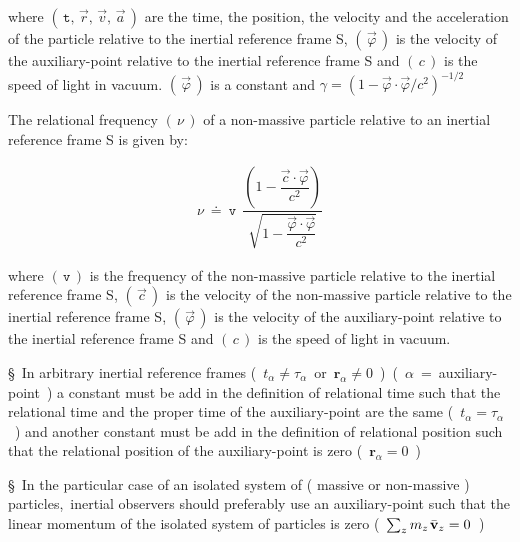 \documentclass[10pt,fleqn]{article}
\begin{document}
\par \vspace{+1.20em}
\noindent where $( \, \mathtt{t}, \, \vec{r}, \, \vec{v}, \, \vec{a} \, )$ are the time, the position, the velocity and the acceleration of the particle relative to the inertial reference frame S, $( \, \vec{\varphi} \, )$ is the velocity of the auxiliary-point relative to the inertial reference frame S and $( \, c \, )$ is the speed of light in vacuum. $( \, \vec{\varphi} \, )$ is a constant and {\small $\gamma = ({1 - \vec{\varphi} \cdot \vec{\varphi}/c^2})^{-1/2}$}

\par \bigskip \smallskip

\noindent The relational frequency $( \, \nu \, )$ of a non-massive particle relative to an inertial reference frame S is given by:
\par \vspace{-0.60em}
\begin{eqnarray*}
\nu ~\doteq~ \mathtt{v} \;\, \dfrac{\left ( 1 - \dfrac{\vec{c} \cdot \vec{\varphi}}{c^2} \right )}{\sqrt{1 - \dfrac{\vec{\varphi} \cdot \vec{\varphi}}{c^2}}}
\end{eqnarray*}
\par \vspace{+0.45em}
\noindent where $( \, \mathtt{v} \, )$ is the frequency of the non-massive particle relative to the inertial reference frame S, $( \, \vec{c} \, )$ is the velocity of the non-massive particle relative to the inertial reference frame S, $( \, \vec{\varphi} \, )$ is the velocity of the auxiliary-point relative to the inertial reference frame S and $( \, c \, )$ is the speed of light in vacuum.

\newpage

\noindent \S \ In arbitrary inertial reference frames \hbox {{\small ( $t_{\alpha} \ne \tau_{\alpha}$ or \hspace{+0.06em}$\mathbf{r}_{\alpha} \ne 0$ ) ( $\alpha$ = auxiliary-point )}} a constant must be add in the definition of relational time such that the relational time and the proper time of the auxiliary-point are the same \hbox {{\small ( $t_{\alpha} = \tau_{\alpha}$ )}} and another constant must be add in the definition of relational position such that the relational position of the auxiliary-point is zero \hbox {{\small ( $\mathbf{r}_{\alpha} = 0$ )}}
\par \bigskip \smallskip
\noindent \S \ In the particular case of an isolated system of ( massive or non-massive ) \hbox {particles, inertial} observers should preferably use an auxiliary-point such that the linear momentum of the isolated system of particles is zero \hbox {{\small ( $\sum_z m_z \hspace{+0.09em} \bar{\mathbf{v}}_z = 0$ )}}
\end{document}
